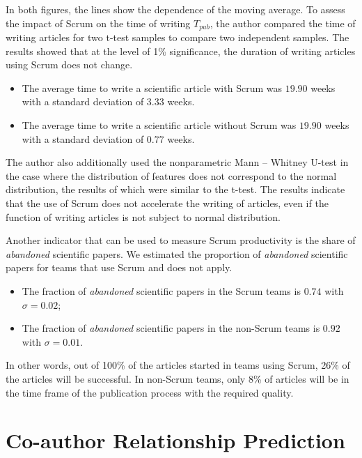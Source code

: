 \documentclass[12pt]{report}
\theoremstyle{definition}
\providecommand{\tightlist}{%
	\setlength{\itemsep}{0pt}\setlength{\parskip}{0pt}}
\begin{document}
In both figures, the lines show the dependence of the moving average.
To assess the impact of Scrum on the time of writing $T_{pub}$, the author compared the time of writing articles for two t-test samples to compare two independent samples.
The results showed that at the level of 1\% significance, the duration of writing articles using Scrum does not change.

\begin{itemize}
	\tightlist
	\item The average time to write a scientific article with Scrum was $19.90$ weeks with a standard deviation of $3.33$ weeks.	
	\item The average time to write a scientific article without Scrum was $19.90$ weeks with a standard deviation of $0.77$ weeks.
\end{itemize}

The author also additionally used the nonparametric Mann -- Whitney U-test in the case where the distribution of features does not correspond to the normal distribution, the results of which were similar to the t-test.
The results indicate that the use of Scrum does not accelerate the writing of articles, even if the function of writing articles is not subject to normal distribution.

Another indicator that can be used to measure Scrum productivity is the share of \textit{abandoned} scientific papers. 
We estimated the proportion of \textit{abandoned} scientific papers for teams that use Scrum and does not apply.

\begin{itemize}
	\tightlist
	\item
	The fraction of \textit{abandoned} scientific papers in the Scrum teams is $0.74$ with $\sigma =  0.02$;
	\item
	The fraction of \textit{abandoned} scientific papers in the non-Scrum teams is $0.92$ with $\sigma =  0.01$.
\end{itemize}

In other words, out of 100\% of the articles started in teams using Scrum, 26\% of the articles will be successful. 
In non-Scrum teams, only 8\% of articles will be in the time frame of the publication process with the required quality.

\section{Co-author Relationship Prediction}
\label{sec:allo}
\end{document}
